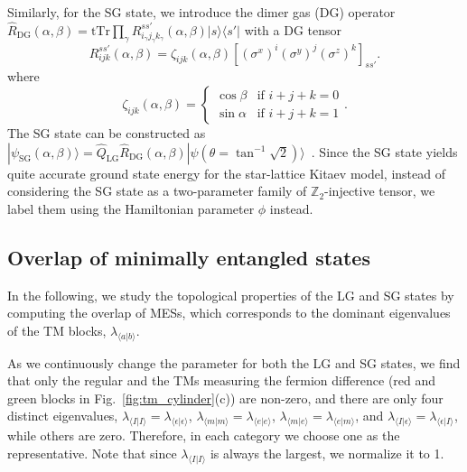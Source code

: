 \documentclass{ntuthesis}
\begin{document}
Similarly, for the SG state, we  introduce the dimer gas (DG) operator $\hat{R}_{\text{DG}}(\alpha, \beta) = \text{tTr}\prod_\gamma {R}^{ss'}_{i_\gamma j_\gamma k_\gamma}(\alpha, \beta)|s\rangle \langle s'| $ with a DG tensor
\begin{equation}
R^{ss'}_{ijk}(\alpha, \beta) = \zeta_{ijk}(\alpha, \beta)[(\sigma^x)^i(\sigma^y)^j(\sigma^z)^k]_{ss'}.
\label{eq:SG}
\end{equation}
where
\begin{equation}
  \zeta_{ijk}(\alpha, \beta)=
    \begin{cases}
      \cos{\beta} & \text{if    } i+j+k = 0\\
      \sin{\alpha} & \text{if    } i+j+k = 1
    \end{cases}.
\end{equation}
%
The SG state can be constructed as $|\psi_\text{SG} (\alpha, \beta)  \rangle = \hat{Q}_\text{LG}\hat{R}_\text{DG}(\alpha, \beta) |\psi(\theta = \tan^{-1}\sqrt2)\rangle$~\cite{non-AbelianTO_2020}.
%
Since the SG state yields quite accurate ground state energy for  the star-lattice Kitaev model, instead of considering  the SG state as a two-parameter family of $\mathbb{ Z}_2 $-injective tensor, we label them using the Hamiltonian parameter $\phi$ instead.


\subsection{Overlap of minimally entangled states}
\label{subsec:overlap of mes}
In the following, we  study the topological properties of the LG and SG states by computing the overlap of MESs, which corresponds to  the dominant eigenvalues of the  TM blocks, $\lambda_{\langle a | b \rangle}$. 
%

As we continuously change the parameter for both the LG and SG states, we find that only the regular and the  TMs measuring the fermion difference (red and green blocks in Fig.~\ref{fig:tm_cylinder}(c)) are non-zero, and there are only four distinct eigenvalues, $\lambda_{\langle I | I\rangle }= \lambda_{\langle \epsilon| \epsilon\rangle} $, $\lambda_{\langle m| m\rangle} = \lambda_{\langle e| e\rangle} $, $ \lambda_{\langle m| e\rangle} = \lambda_{\langle e| m\rangle} $, and $\lambda_{\langle I| \epsilon\rangle} = \lambda_{\langle \epsilon| I\rangle} $, while others are zero. 
%
Therefore, in each category we choose one as the representative.  
% 
Note that since  $\lambda_{\langle I | I \rangle} $ is always the largest, we normalize it to 1. 
\end{document}
